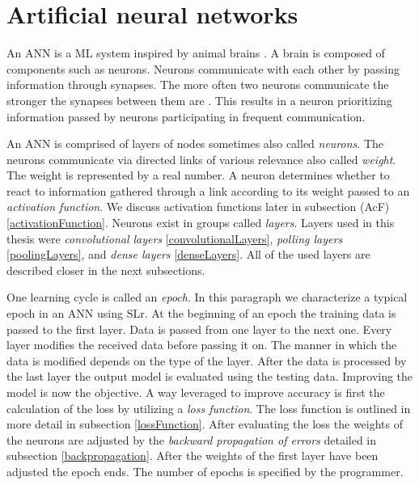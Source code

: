 \section{Artificial neural networks} \label{artificialNeuralNetworks}
An ANN is a ML system inspired by animal brains \cite{machineLeraningApproaches}. A brain is composed of components such as neurons. Neurons communicate with each other by passing information through synapses. The more often two neurons communicate the stronger the synapses between them are \cite{neuronsInBrain}. This results in a neuron prioritizing information passed by neurons participating in frequent communication. 

An ANN is comprised of layers of nodes sometimes also called \textit{neurons}. The neurons communicate via directed links of various relevance also called \textit{weight}. The weight is represented by a real number. A neuron determines whether to react to information gathered through a link according to its weight passed to an \textit{activation function}. We discuss activation functions later in subsection (AcF) \ref{activationFunction}. Neurons exist in groups called \textit{layers}. Layers used in this thesis were \textit{convolutional layers} \ref{convolutionalLayers}, \textit{polling layers} \ref{poolingLayers}, and \textit{dense layers} \ref{denseLayers}. All of the used layers are described closer in the next subsections. 

One learning cycle is called an \textit{epoch}. In this paragraph we characterize a typical epoch in an ANN using SLr. At the beginning of an epoch the training data is passed to the first layer. Data is passed from one layer to the next one. Every layer modifies the received data before passing it on. The manner in which the data is modified depends on the type of the layer. After the data is processed by the last layer the output model is evaluated using the testing data. Improving the model is now the objective. A way leveraged to improve accuracy is first the calculation of the loss by utilizing a \textit{loss function}. The loss function is outlined in more detail in subsection \ref{lossFunction}. After evaluating the loss the weights of the neurons are adjusted by the \textit{backward propagation of errors} detailed in subsection \ref{backpropagation}. After the weights of the first layer have been adjusted the epoch ends. The number of epochs is specified by the programmer. 

